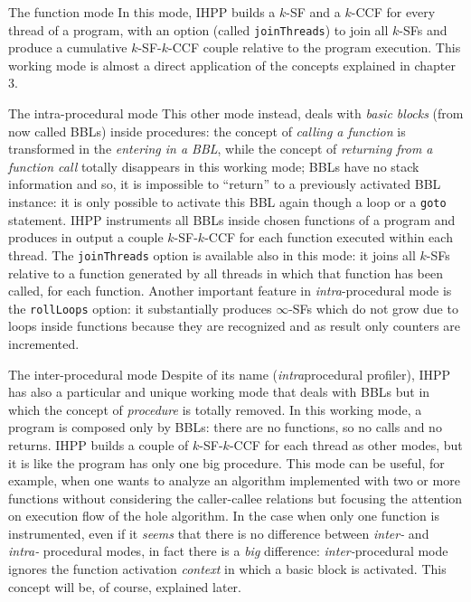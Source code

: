 \documentclass[a4paper,10pt]{report}
\begin{document}
\begin{paragraph}{The function mode}
In this mode, IHPP builds a $k$-SF and a $k$-CCF for every thread of a program,
with an option (called \verb|joinThreads|) to join all $k$-SFs and produce a cumulative $k$-SF-$k$-CCF couple relative to the program execution.
This working mode is almost a direct application of the concepts explained in chapter 3. 
\end{paragraph}

\begin{paragraph}{The intra-procedural mode}
This other mode instead, deals with \emph{basic blocks} (from now called BBLs) inside procedures: the concept of \emph{calling a function} is transformed in the \emph{entering in a BBL}, while the concept of \emph{returning from a function call} totally disappears in this working mode; BBLs have no stack information and so, it is impossible to ``return'' to a previously activated BBL instance: it is only possible to activate this BBL again though a loop or a \verb|goto| statement.
IHPP instruments all BBLs inside chosen functions of a program and produces in output a couple $k$-SF-$k$-CCF for each function executed within each thread. The \verb|joinThreads| option is available also in this mode: it joins all $k$-SFs relative to a function generated by all threads in which that function has been called, for each function.
Another important feature in \emph{intra}-procedural mode is the \verb|rollLoops| option: it substantially produces $\infty$-SFs which do not grow due to loops inside functions because they are recognized and as result only counters are incremented. 
\end{paragraph}

\begin{paragraph}{The inter-procedural mode}
Despite of its name (\emph{intra}procedural profiler), IHPP has also a particular and unique working mode that deals with BBLs but in which the concept of \emph{procedure} is totally removed. In this working mode, a program is composed only by BBLs: there are no functions, so no calls and no returns. IHPP builds a couple of $k$-SF-$k$-CCF for each thread as other modes, but it is like the program has only one big procedure. This mode can be useful, for example, when one wants to analyze an algorithm implemented with two or more functions without considering the caller-callee relations but focusing the attention on execution flow of the hole algorithm. In the case when only one function is instrumented, even if it \emph{seems} that there is no difference between \emph{inter-} and \emph{intra-} procedural modes, in fact there is a \emph{big} difference: \emph{inter-}procedural mode ignores 
the function activation \emph{context} in which a basic block is activated. 
This concept will be, of course, explained later.
\end{paragraph}
\end{document}
